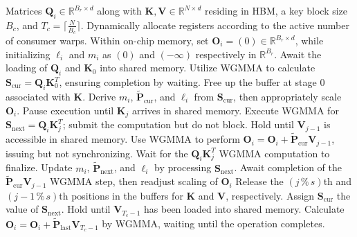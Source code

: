 \begin{algorithm}[H]
    \caption{\small\label{alg:flash3_wgmma}\textsc{FlashAttention-3} consumer warpgroup forward pass}
    \begin{algorithmic}[1]
      \REQUIRE  Matrices $\mathbf{Q}_i \in \mathbb{R}^{B_r \times d}$ along with $\mathbf{K}, \mathbf{V} \in \mathbb{R}^{N \times d}$ residing in HBM, a key block size $B_c$, and $T_c = \lceil \frac{N}{B_c} \rceil$.
      \STATE Dynamically allocate registers according to the active number of consumer warps.
      \STATE Within on-chip memory, set $\mathbf{O}_i = (0) \in \mathbb{R}^{B_r \times d}$, while initializing $\ell_i$ and $m_i$ as $(0)$ and $(-\infty)$ respectively in $\mathbb{R}^{B_r}$.
      \STATE Await the loading of $\mathbf{Q}_i$ and $\mathbf{K}_0$ into shared memory.
      \STATE Utilize WGMMA to calculate $\mathbf{S}_{\mathrm{cur}} = \mathbf{Q}_i \mathbf{K}_0^T$, ensuring completion by waiting. 
      \STATE Free up the buffer at stage $0$ associated with $\mathbf{K}$.
      \STATE Derive $m_{i}$, $\tilde{\mathbf{P}}_{\mathrm{cur}}$, and $\ell_{i}$ from $\mathbf{S}_{\mathrm{cur}}$, then appropriately scale $\mathbf{O}_i$.
        \STATE Pause execution until $\mathbf{K}_j$ arrives in shared memory.
        \label{code:mainloop_start}
        \STATE Execute WGMMA for $\mathbf{S}_{\mathrm{next}} = \mathbf{Q}_i \mathbf{K}_{j}^T$; submit the computation but do not block.
        \label{code:first_wgmma}
        \STATE Hold until $\mathbf{V}_{j-1}$ is accessible in shared memory.
        \STATE Use WGMMA to perform $\mathbf{O}_{i} = \mathbf{O}_{i} + \tilde{\mathbf{P}}_{\mathrm{cur}} \mathbf{V}_{j-1}$, issuing but not synchronizing.
        \label{code:second_wgmma}
        \STATE Wait for the $\mathbf{Q}_i \mathbf{K}_{j}^T$ WGMMA computation to finalize.
        \STATE Update $m_{i}$, $\tilde{\mathbf{P}}_{\mathrm{next}}$, and $\ell_{i}$ by processing $\mathbf{S}_{\mathrm{next}}$. 
        \label{code:softmax}
        \STATE Await completion of the $\tilde{\mathbf{P}}_{\mathrm{cur}} \mathbf{V}_{j-1}$ WGMMA step, then readjust scaling of $\mathbf{O}_i$
        \STATE Release the $(j\,\%\,s)$th and $(j-1\,\%\,s)$th positions in the buffers for $\mathbf{K}$ and $\mathbf{V}$, respectively.
        \STATE Assign $\mathbf{S}_{\mathrm{cur}}$ the value of $\mathbf{S}_{\mathrm{next}}$.
        \label{code:mainloop_end}
      \ENDFOR 
      \STATE Hold until $\mathbf{V}_{T_c - 1}$ has been loaded into shared memory.
      \STATE Calculate
      $\mathbf{O}_{i} = \mathbf{O}_{i} + \tilde{\mathbf{P}}_{\mathrm{last}} \mathbf{V}_{T_c - 1}$ by WGMMA, waiting until the operation completes.


\end{algorithmic}
\end{algorithm}
